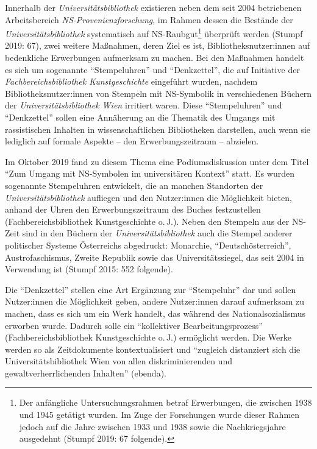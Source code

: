 \documentclass[a4paper,
fontsize=11pt,
oneside,
numbers=noperiodatend,
parskip=half-,
bibliography=totoc,
final
]{scrartcl}
\begin{document}
Innerhalb der \emph{Universitätsbibliothek} existieren neben dem seit
2004 betriebenen Arbeitsbereich \emph{NS-Provenienzforschung}, im Rahmen
dessen die Bestände der \emph{Universitätsbibliothek} systematisch auf
NS-Raubgut\footnote{Der anfängliche Untersuchungsrahmen betraf
  Erwerbungen, die zwischen 1938 und 1945 getätigt wurden. Im Zuge der
  Forschungen wurde dieser Rahmen jedoch auf die Jahre zwischen 1933 und
  1938 sowie die Nachkriegsjahre ausgedehnt (Stumpf 2019: 67 folgende).}
überprüft werden (Stumpf 2019: 67), zwei weitere Maßnahmen, deren Ziel
es ist, Bibliotheksnutzer:innen auf bedenkliche Erwerbungen aufmerksam
zu machen. Bei den Maßnahmen handelt es sich um sogenannte
\enquote{Stempeluhren} und \enquote{Denkzettel}, die auf Initiative der
\emph{Fachbereichsbibliothek Kunstgeschichte} eingeführt wurden, nachdem
Bibliotheksnutzer:innen von Stempeln mit NS-Symbolik in verschiedenen
Büchern der \emph{Universitätsbibliothek Wien} irritiert waren. Diese
\enquote{Stempeluhren} und \enquote{Denkzettel} sollen eine Annäherung an die
Thematik des Umgangs mit rassistischen Inhalten in wissenschaftlichen
Bibliotheken darstellen, auch wenn sie lediglich auf formale Aspekte --
den Erwerbungszeitraum -- abzielen.

Im Oktober 2019 fand zu diesem Thema eine Podiumsdiskussion unter dem
Titel \enquote{Zum Umgang mit NS-Symbolen im universitären Kontext} statt. Es
wurden sogenannte Stempeluhren entwickelt, die an manchen Standorten der
\emph{Universitätsbibliothek} aufliegen und den Nutzer:innen die
Möglichkeit bieten, anhand der Uhren den Erwerbungszeitraum des Buches
festzustellen (Fachbereichsbibliothek Kunstgeschichte o.\,J.). Neben den
Stempeln aus der NS-Zeit sind in den Büchern der
\emph{Universitätsbibliothek} auch die Stempel anderer politischer
Systeme Österreichs abgedruckt: Monarchie, \enquote{Deutschösterreich},
Austrofaschismus, Zweite Republik sowie das Universitätssiegel, das seit
2004 in Verwendung ist (Stumpf 2015: 552 folgende).

Die \enquote{Denkzettel} stellen eine Art Ergänzung zur \enquote{Stempeluhr} dar und
sollen Nutzer:innen die Möglichkeit geben, andere Nutzer:innen darauf
aufmerksam zu machen, dass es sich um ein Werk handelt, das während des
Nationalsozialismus erworben wurde. Dadurch solle ein \enquote{kollektiver
Bearbeitungsprozess} (Fachbereichsbibliothek Kunstgeschichte o.\,J.)
ermöglicht werden. Die Werke werden so als Zeitdokumente
kontextualisiert und \enquote{zugleich distanziert sich die
Universitätsbibliothek Wien von allen diskriminierenden und
gewaltverherrlichenden Inhalten} (ebenda).
\end{document}
